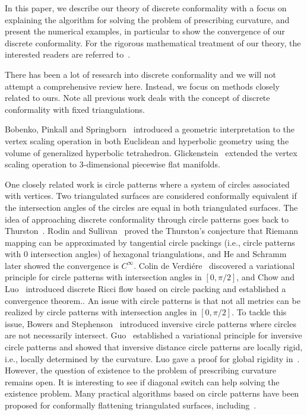 \documentclass[11pt]{article}
\begin{document}
In this paper, we describe our theory of discrete conformality with a focus on explaining
the algorithm for solving the problem of prescribing curvature, and present the
numerical examples, in particular to show the convergence of our discrete conformality. 
For the rigorous mathematical treatment of our theory, the interested readers are 
referred to~\cite{glsw1, glsw2}. 

\vspace{0.1in}
There has been a lot of research into discrete conformality and we will not attempt 
a comprehensive review here. Instead, we focus on methods closely related to 
ours. Note all previous work deals with the concept of discrete conformality with 
fixed triangulations.  

Bobenko, Pinkall and Springborn~\cite{bps} introduced a geometric interpretation 
to the vertex scaling operation in both Euclidean and hyperbolic geometry using the 
volume of generalized hyperbolic tetrahedron. Glickenstein~\cite{Glickenstein1, Glickenstein2} 
extended the vertex scaling operation  to 3-dimensional piecewise flat manifolds.

One closely related work is circle patterns where a system of circles associated with
vertices. Two triangulated surfaces are considered conformally equivalent if the 
intersection angles of the circles are equal in both triangulated surfaces. 
The idea of approaching discrete
conformality through circle patterns goes back to Thurston~\cite{Stephenson03}. 
Rodin and Sullivan~\cite{RS} proved the Thurston's conjecture that Riemann mapping 
can be approximated by tangential circle packings (i.e., circle patterns with $0$ 
intersection angles) of hexagonal triangulations, and He and Schramm~\cite{he98} 
later showed the convergence is $C^{\infty}$. Colin de Verdi\'{e}re~\cite{verdiere} 
discovered a variational 
principle for circle patterns with intersection angles in $[0, \pi/2]$, 
and Chow and Luo~\cite{chow} introduced discrete Ricci flow based on circle packing and 
established a convergence theorem.. 
An issue with circle patterns is that not all metrics can be realized by circle patterns with 
intersection angles in $[0, \pi/2]$. To tackle this issue, Bowers and Stephenson~\cite{Bowers} 
introduced inversive circle patterns where circles are not necessarily intersect.
Guo~\cite{Guo} established a variational principle for inversive circle patterns 
and showed that inversive distance circle patterns are locally rigid, i.e., locally 
determined by the curvature. Luo gave a proof for global rigidity in~\cite{Luo2011}.
However, the question of existence to the problem of prescribing curvature 
remains open. It is interesting to see if diagonal switch can help solving the existence problem. 
Many practical algorithms based on circle patterns have been proposed for conformally 
flattening triangulated surfaces, including~\cite{Kharevych, Jin}.
\end{document}
